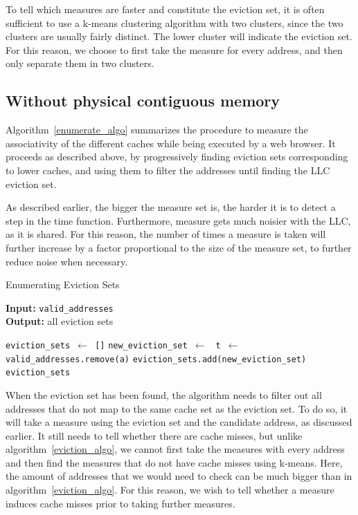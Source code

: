 \documentclass[a4paper,11pt,oneside]{report}
\begin{document}
To tell which measures are faster and constitute the eviction set, it is often sufficient to use a k-means clustering algorithm with two clusters, since the two clusters are usually fairly distinct. The lower cluster will indicate the eviction set. For this reason, we choose to first take the measure for every address, and then only separate them in two clusters.

\subsection{Without physical contiguous memory}

Algorithm~\ref{enumerate_algo} summarizes the procedure to measure the associativity of the different caches while being executed by a web browser.
It proceeds as described above, by progressively finding eviction sets corresponding to lower caches, and using them to filter the addresses until finding the LLC eviction set.

As described earlier, the bigger the measure set is, the harder it is to detect a step in the time function. Furthermore, measure gets much noisier with the LLC, as it is shared. For this reason, the number of times a measure is taken will further increase by a factor proportional to the size of the measure set, to further reduce noise when necessary.

\begin{algorithm}
\caption{Enumerating Eviction Sets}\label{enumerate_algo}
\hspace*{\algorithmicindent} \textbf{Input:} \texttt{valid\_addresses}\\
\hspace*{\algorithmicindent} \textbf{Output:} all eviction sets
\begin{algorithmic}[1]
\State \texttt{eviction\_sets $\gets$ []}
\State \texttt{new\_eviction\_set $\gets$ }
\State \texttt{t $\gets$ }
\State \texttt{valid\_addresses.remove(a)}
\EndIf
\EndFor
\State \texttt{eviction\_sets.add(new\_eviction\_set)}
\EndFor
\State \Return \texttt{eviction\_sets}
\EndProcedure
\end{algorithmic}
\end{algorithm}

When the eviction set has been found, the algorithm needs to filter out all addresses that do not map to the same cache set as the eviction set. To do so, it will take a measure using the eviction set and the candidate address, as discussed earlier. It still needs to tell whether there are cache misses, but unlike algorithm~\ref{eviction_algo}, we cannot first take the measures with every address and then find the measures that do not have cache misses using k-means. Here, the amount of addresses that we would need to check can be much bigger than in algorithm~\ref{eviction_algo}. For this reason, we wish to tell whether a measure induces cache misses prior to taking further measures. 
\end{document}
